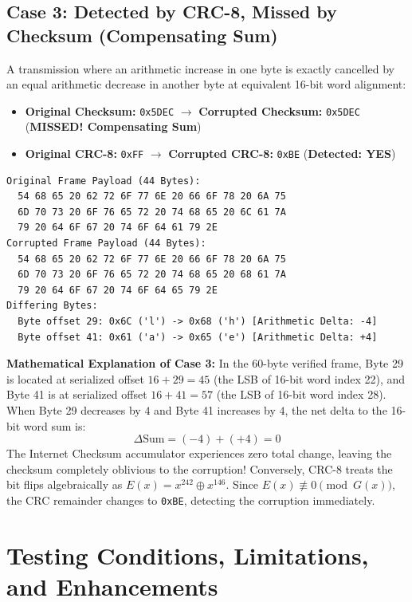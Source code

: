 \documentclass[11pt,a4paper]{article}
\begin{document}
\subsection{Case 3: Detected by CRC-8, Missed by Checksum (Compensating Sum)}
A transmission where an arithmetic increase in one byte is exactly cancelled by an equal arithmetic decrease in another byte at equivalent 16-bit word alignment:
\begin{itemize}
    \item \textbf{Original Checksum:} \texttt{0x5DEC} $\longrightarrow$ \textbf{Corrupted Checksum:} \texttt{0x5DEC} (\textbf{MISSED! Compensating Sum})
    \item \textbf{Original CRC-8:} \texttt{0xFF} $\longrightarrow$ \textbf{Corrupted CRC-8:} \texttt{0xBE} (\textbf{Detected: YES})
\end{itemize}
\begin{lstlisting}[style=hexstyle, caption={Case 3 Payload Hex Dumps (Compensating Checksum Collision)}]
Original Frame Payload (44 Bytes):
  54 68 65 20 62 72 6F 77 6E 20 66 6F 78 20 6A 75 
  6D 70 73 20 6F 76 65 72 20 74 68 65 20 6C 61 7A 
  79 20 64 6F 67 20 74 6F 64 61 79 2E 
Corrupted Frame Payload (44 Bytes):
  54 68 65 20 62 72 6F 77 6E 20 66 6F 78 20 6A 75 
  6D 70 73 20 6F 76 65 72 20 74 68 65 20 68 61 7A 
  79 20 64 6F 67 20 74 6F 64 65 79 2E 
Differing Bytes:
  Byte offset 29: 0x6C ('l') -> 0x68 ('h') [Arithmetic Delta: -4]
  Byte offset 41: 0x61 ('a') -> 0x65 ('e') [Arithmetic Delta: +4]
\end{lstlisting}

\textbf{Mathematical Explanation of Case 3:} In the 60-byte verified frame, Byte 29 is located at serialized offset $16 + 29 = 45$ (the LSB of 16-bit word index 22), and Byte 41 is at serialized offset $16 + 41 = 57$ (the LSB of 16-bit word index 28). When Byte 29 decreases by $4$ and Byte 41 increases by $4$, the net delta to the 16-bit word sum is:
\begin{equation}
    \Delta \text{Sum} = (-4) + (+4) = 0
\end{equation}
The Internet Checksum accumulator experiences zero total change, leaving the checksum completely oblivious to the corruption! Conversely, CRC-8 treats the bit flips algebraically as $E(x) = x^{242} \oplus x^{146}$. Since $E(x) \not\equiv 0 \pmod{G(x)}$, the CRC remainder changes to \texttt{0xBE}, detecting the corruption immediately.

\section{Testing Conditions, Limitations, and Enhancements}
\end{document}
